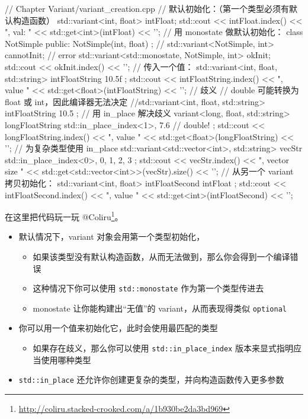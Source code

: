 \begin{codebox}[cpp]
// Chapter Variant/variant_creation.cpp
// 默认初始化：（第一个类型必须有默认构造函数）
std::variant<int, float> intFloat;
std::cout << intFloat.index() << ", val: " << std::get<int>(intFloat) << '\n';
// 用 monostate 做默认初始化：
class NotSimple
{
public:
NotSimple(int, float) { }
};
// std::variant<NotSimple, int> cannotInit; // error
std::variant<std::monostate, NotSimple, int> okInit;
std::cout << okInit.index() << '\n';
// 传入一个值：
std::variant<int, float, std::string> intFloatString { 10.5f };
std::cout << intFloatString.index()
<< ", value " << std::get<float>(intFloatString) << '\n';
// 歧义
// double 可能转换为 float 或 int，因此编译器无法决定
//std::variant<int, float, std::string> intFloatString { 10.5 };
// 用 in_place 解决歧义
variant<long, float, std::string> longFloatString {
std::in_place_index<1>, 7.6 // double!
};
std::cout << longFloatString.index() << ", value "
<< std::get<float>(longFloatString) << '\n';
// 为复杂类型使用 in_place
std::variant<std::vector<int>, std::string> vecStr {
std::in_place_index<0>, { 0, 1, 2, 3 }
};
std::cout << vecStr.index() << ", vector size "
<< std::get<std::vector<int>>(vecStr).size() << '\n';
// 从另一个 variant 拷贝初始化：
std::variant<int, float> intFloatSecond { intFloat };
std::cout << intFloatSecond.index() << ", value "
<< std::get<int>(intFloatSecond) << '\n';
\end{codebox}

在这里把代码玩一玩 @Coliru\footnote{\url{http://coliru.stacked-crooked.com/a/1b930be2da3bd969}}。

\begin{itemize}
\item 默认情况下，variant 对象会用第一个类型初始化，
  \begin{itemize}
  \item 如果该类型没有默认构造函数，从而无法做到，那么你会得到一个编译错误
  \item 这种情况下你可以使用 \texttt{std::monostate} 作为第一个类型传进去
  \item monostate 让你能构建出“无值”的 variant，从而表现得类似 \texttt{optional}
  \end{itemize}
\item 你可以用一个值来初始化它，此时会使用最匹配的类型
  \begin{itemize}
  \item 如果存在歧义，那么你可以使用 \texttt{std::in\_place\_index} 版本来显式指明应当使用哪种类型
  \end{itemize}
\item \texttt{std::in\_place} 还允许你创建更复杂的类型，并向构造函数传入更多参数
\end{itemize}

